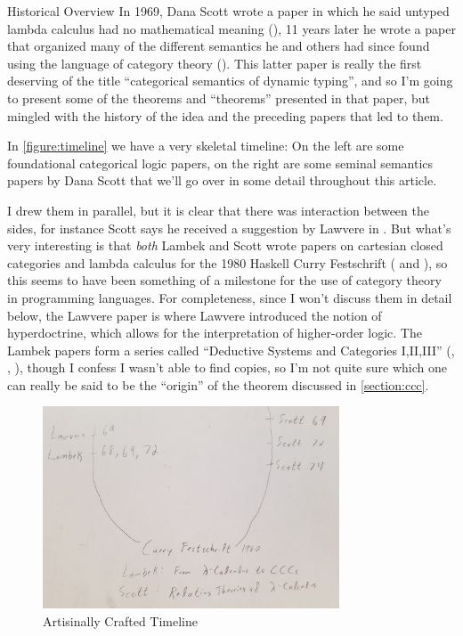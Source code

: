 \documentclass{article}
\begin{document}
\begin{section}{Historical Overview}
  In 1969, Dana Scott wrote a paper in which he said untyped lambda
  calculus had no mathematical meaning (\cite{scott1993type}), 11
  years later he wrote a paper that organized many of the different
  semantics he and others had since found using the language of
  category theory (\cite{scott80relating}). This latter paper is
  really the first deserving of the title ``categorical semantics of
  dynamic typing'', and so I'm going to present some of the theorems
  and ``theorems'' presented in that paper, but mingled with the
  history of the idea and the preceding papers that led to them.

  In \autoref{figure:timeline} we have a very skeletal timeline: On
  the left are some foundational categorical logic papers, on the
  right are some seminal semantics papers by Dana Scott that we'll go
  over in some detail throughout this article.

  I drew them in parallel, but it is clear that there was interaction
  between the sides, for instance Scott says he received a suggestion
  by Lawvere in \cite{scott1972continuous}. But what's very
  interesting is that \emph{both} Lambek and Scott wrote papers on
  cartesian closed categories and lambda calculus for the 1980 Haskell
  Curry Festschrift (\cite{lambek80lambdaccc} and
  \cite{scott80relating}), so this seems to have been something of a
  milestone for the use of category theory in programming languages.
  For completeness, since I won't discuss them in detail below, the
  Lawvere paper is \cite{lawvere1969adjointness} where Lawvere
  introduced the notion of hyperdoctrine, which allows for the
  interpretation of higher-order logic. The Lambek papers form a
  series called ``Deductive Systems and Categories I,II,III''
  (\cite{lambek68deductive}, \cite{lambek69deductive},
  \cite{lambek1972deductive}), though I confess I wasn't able to find
  copies, so I'm not quite sure which one can really be said to be the
  ``origin'' of the theorem discussed in \autoref{section:ccc}.
  \begin{figure}
    \begin{center}
      \includegraphics[height=6cm]{timeline}
    \end{center}
    \caption{Artisinally Crafted Timeline}
    \label{figure:timeline}
  \end{figure}
\end{section}
\end{document}

